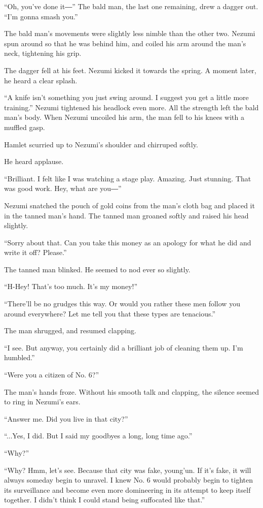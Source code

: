 ``Oh, you've done it―'' The bald man, the last one remaining, drew a
dagger out. ``I'm gonna smash you.''

The bald man's movements were slightly less nimble than the other two.
Nezumi spun around so that he was behind him, and coiled his arm around
the man's neck, tightening his grip.

The dagger fell at his feet. Nezumi kicked it towards the spring. A
moment later, he heard a clear splash.

``A knife isn't something you just swing around. I suggest you get a
little more training.'' Nezumi tightened his headlock even more. All the
strength left the bald man's body. When Nezumi uncoiled his arm, the man
fell to his knees with a muffled gasp.

Hamlet scurried up to Nezumi's shoulder and chirruped softly.

He heard applause.

``Brilliant. I felt like I was watching a stage play. Amazing. Just
stunning. That was good work. Hey, what are you―''

Nezumi snatched the pouch of gold coins from the man's cloth bag and
placed it in the tanned man's hand. The tanned man groaned softly and
raised his head slightly.

``Sorry about that. Can you take this money as an apology for what he
did and write it off? Please.''

The tanned man blinked. He seemed to nod ever so slightly.

``H-Hey! That's too much. It's my money!''

``There'll be no grudges this way. Or would you rather these men follow
you around everywhere? Let me tell you that these types are tenacious.''

The man shrugged, and resumed clapping.

``I see. But anyway, you certainly did a brilliant job of cleaning them
up. I'm humbled.''

``Were you a citizen of No. 6?''

The man's hands froze. Without his smooth talk and clapping, the silence
seemed to ring in Nezumi's ears.

``Answer me. Did you live in that city?''

``...Yes, I did. But I said my goodbyes a long, long time ago.''

``Why?''

``Why? Hmm, let's see. Because that city was fake, young'un. If it's
fake, it will always someday begin to unravel. I knew No. 6 would
probably begin to tighten its surveillance and become even more
domineering in its attempt to keep itself together. I didn't think I
could stand being suffocated like that.''

